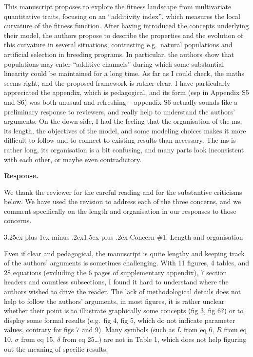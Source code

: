 \documentclass[11pt,a4paper]{article}
\makeatletter
\newcommand{\response}{%
  \par\medskip\noindent\textbf{\color{ResponseColor}Response.}\quad\ignorespaces
}
\renewcommand{\subsection}{\@startsection{subsection}{2}{0pt}%
  {3.25ex plus 1ex minus .2ex}{1.5ex plus .2ex}%
  {\large\bfseries}}
\makeatother
\begin{document}
\begin{revquote}
This manuscript proposes to explore the fitness landscape from multivariate quantitative traits, focusing on an ``additivity index'', which measures the local curvature of the fitness function. After having introduced the concepts underlying their model, the authors propose to describe the properties and the evolution of this curvature in several situations, contrasting e.g.\ natural populations and artificial selection in breeding programs. In particular, the authors show that populations may enter ``additive channels'' during which some substantial linearity could be maintained for a long time. As far as I could check, the maths seems right, and the proposed framework is rather clear. I have particularly appreciated the appendix, which is pedagogical, and its form (esp in Appendix S5 and S6) was both unusual and refreshing -- appendix S6 actually sounds like a preliminary response to reviewers, and really help to understand the authors' arguments. On the down side, I had the feeling that the organisation of the ms, its length, the objectives of the model, and some modeling choices makes it more difficult to follow and to connect to existing results than necessary. The ms is rather long, its organisation is a bit confusing, and many parts look inconsistent with each other, or maybe even contradictory.
\end{revquote}

\response
We thank the reviewer for the careful reading and for the substantive criticisms below. We have used the revision to address each of the three concerns, and we comment specifically on the length and organisation in our responses to those concerns.

\subsection{Concern \#1: Length and organisation}

\begin{revquote}
Even if clear and pedagogical, the manuscript is quite lengthy and keeping track of the authors' arguments is sometimes challenging. With 11 figures, 4 tables, and 28 equations (excluding the 6 pages of supplementary appendix), 7 section headers and countless subsections, I found it hard to understand where the authors wished to drive the reader. The lack of methodological details does not help to follow the authors' arguments, in most figures, it is rather unclear whether their point is to illustrate graphically some concepts (fig 3, fig 6?) or to display some formal results (e.g.\ fig 4, fig 5, which do not indicate parameter values, contrary for figs 7 and 9). Many symbols (such as $L$ from eq 6, $R$ from eq 10, $\sigma$ from eq 15, $\delta$ from eq 25\ldots) are not in Table 1, which does not help figuring out the meaning of specific results.
\end{revquote}
\end{document}
